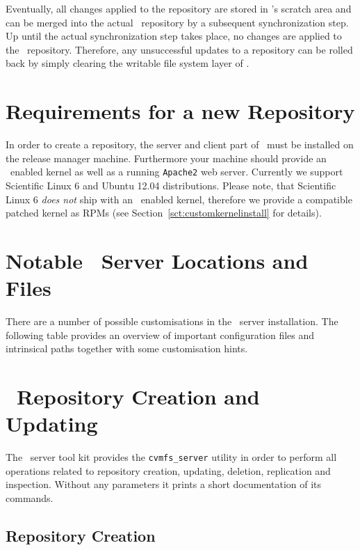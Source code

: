 Eventually, all changes applied to the repository are stored in \aufs's scratch area and can be merged into the actual \cvmfs\ repository by a subsequent synchronization step.
Up until the actual synchronization step takes place, no changes are applied to the \cvmfs\ repository.
Therefore, any unsuccessful updates to a repository can be rolled back by simply clearing the writable file system layer of \aufs.

\section{Requirements for a new Repository}
\label{sct:newreporequirements}

In order to create a repository, the server and client part of \cvmfs\ must be installed on the release manager machine.
Furthermore your machine should provide an \aufs\ enabled kernel as well as a running \texttt{Apache2} web server.
Currently we support Scientific Linux 6 and Ubuntu 12.04 distributions.
Please note, that Scientific Linux 6 \emph{does not} ship with an \aufs\ enabled kernel, therefore we provide a compatible patched kernel as RPMs (see Section~\ref{sct:customkernelinstall} for details).


\pagebreak
\section{Notable \cvmfs\ Server Locations and Files}
\label{sct:repoanatomy}
There are a number of possible customisations in the \cvmfs\ server installation.
The following table provides an overview of important configuration files and intrinsical paths together with some customisation hints.


\section{\cvmfs\ Repository Creation and Updating}
\label{sct:repocreateandupdate}
The \cvmfs\ server tool kit provides the \texttt{cvmfs\_server} utility in order to perform all operations related to repository creation, updating, deletion, replication and inspection.
Without any parameters it prints a short documentation of its commands.

\subsection{Repository Creation}
\label{sct:repocreation}

